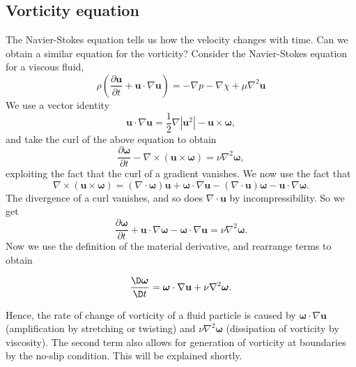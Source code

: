 \documentclass[a4paper]{article}
\begin{document}
\subsection{Vorticity equation}
The Navier-Stokes equation tells us how the velocity changes with time. Can we obtain a similar equation for the vorticity? Consider the Navier-Stokes equation for a viscous fluid,
\[
  \rho\left(\frac{\partial \mathbf{u}}{\partial t} + \mathbf{u}\cdot \nabla \mathbf{u}\right) = -\nabla p - \nabla \chi + \mu \nabla^2 \mathbf{u}
\]
We use a vector identity
\[
  \mathbf{u}\cdot \nabla \mathbf{u} = \frac{1}{2}\nabla |\mathbf{u}^2| - \mathbf{u}\times \boldsymbol\omega,
\]
and take the curl of the above equation to obtain
\[
  \frac{\partial \boldsymbol\omega}{\partial t} - \nabla \times (\mathbf{u}\times \boldsymbol\omega) = \nu \nabla^2 \boldsymbol\omega,
\]
exploiting the fact that the curl of a gradient vanishes. We now use the fact that
\[
  \nabla \times (\mathbf{u}\times \boldsymbol\omega) = (\nabla \cdot \boldsymbol\omega) \mathbf{u} + \boldsymbol\omega \cdot \nabla \mathbf{u} - (\nabla \cdot \mathbf{u}) \boldsymbol\omega - \mathbf{u}\cdot \nabla \boldsymbol\omega.
\]
The divergence of a curl vanishes, and so does $\nabla \cdot \mathbf{u}$ by incompressibility. So we get
\[
  \frac{\partial \boldsymbol\omega}{\partial t} + \mathbf{u}\cdot \nabla \boldsymbol\omega - \boldsymbol\omega \cdot \nabla \mathbf{u} = \nu \nabla^2 \boldsymbol \omega.
\]
Now we use the definition of the material derivative, and rearrange terms to obtain
\begin{prop}
  \[
    \frac{\D \boldsymbol\omega}{\D t} = \boldsymbol\omega \cdot \nabla \mathbf{u} + \nu \nabla^2 \boldsymbol\omega.
  \]
\end{prop}
Hence, the rate of change of vorticity of a fluid particle is caused by $\boldsymbol\omega \cdot \nabla \mathbf{u}$ (amplification by stretching or twisting) and $\nu \nabla^2 \boldsymbol\omega$ (dissipation of vorticity by viscosity). The second term also allows for generation of vorticity at boundaries by the no-slip condition. This will be explained shortly.
\end{document}
